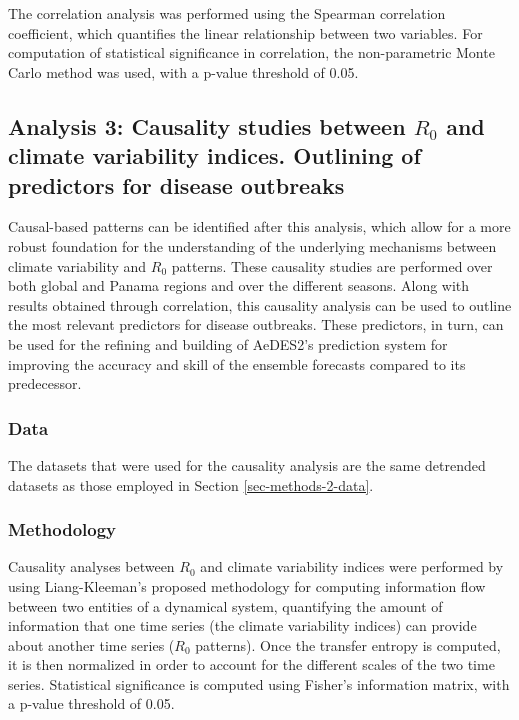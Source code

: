 \documentclass[10pt,twocolumn]{wlscirep}
\begin{document}
The correlation analysis was performed using the Spearman correlation coefficient, which quantifies the linear relationship between two variables. For computation of statistical significance in correlation, the non-parametric Monte Carlo method was used\cite{new_2000}, with a p-value threshold of 0.05.

\subsection{Analysis 3: Causality studies between $R_0$ and climate variability indices. Outlining of predictors for disease outbreaks} \label{sec-methods-3}

Causal-based patterns can be identified after this analysis, which allow for a more robust foundation for the understanding of the underlying mechanisms between climate variability and $R_0$ patterns. These causality studies are performed over both global and Panama regions and over the different seasons. Along with results obtained through correlation, this causality analysis can be used to outline the most relevant predictors for disease outbreaks. These predictors, in turn, can be used for the refining and building of AeDES2's prediction system for improving the accuracy and skill of the ensemble forecasts compared to its predecessor.

\subsubsection{Data} \label{sec-methods-3-data}

The datasets that were used for the causality analysis are the same detrended datasets as those employed in Section \ref{sec-methods-2-data}.

\subsubsection{Methodology} \label{sec-methods-3-methodology}

Causality analyses between $R_0$ and climate variability indices were performed by using Liang-Kleeman's proposed methodology for computing information flow between two entities of a dynamical system, quantifying the amount of information that one time series (the climate variability indices) can provide about another time series ($R_0$ patterns)\cite{liang_2014}. Once the transfer entropy is computed, it is then normalized in order to account for the different scales of the two time series\cite{liang_2015}. Statistical significance is computed using Fisher's information matrix, with a p-value threshold of 0.05.
\end{document}

